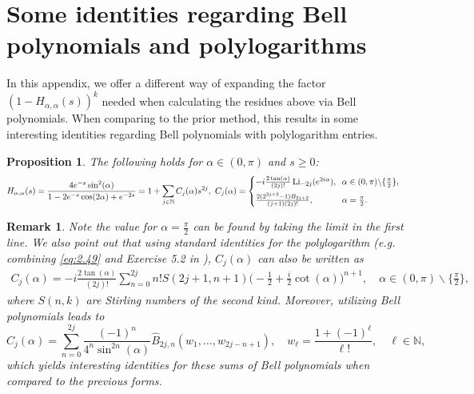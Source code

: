 \documentclass[letterpaper,10pt]{amsart}
\newtheorem{prop}[thm]{Proposition}
\newtheorem{remark}[thm]{Remark}
\DeclareMathOperator{\Li}{Li}
\numberwithin{equation}{section}
\begin{document}
\appendix

\section{Some identities regarding Bell polynomials and polylogarithms}\label{AppPoly}

In this appendix, we offer a different way of expanding the factor $(1-H_{\alpha,\alpha}(s))^k$ needed when calculating the residues above via Bell polynomials. When comparing to the prior method, this results in some interesting identities regarding Bell polynomials with polylogarithm entries.

\begin{prop}\label{Lem:H}
The following holds for $\alpha\in(0,\pi)$ and $s\geq0$: 
\begin{align}\label{Eq:Hseries}
&H_{\alpha,\alpha}(s)=\frac{4e^{-s}\sin^2(\alpha)}{1-2e^{-s}\cos(2\alpha)+e^{-2s}}=1+\sum_{j\in\mathbb{N}} C_j(\alpha) s^{2j},\ C_j(\alpha)=\begin{cases}
-i\frac{2\tan(\alpha)}{(2j)!}\Li_{-2j}(e^{2i\alpha}),& \hspace{-.1cm}\alpha\in(0,\pi)\backslash\{\tfrac{\pi}{2}\},\\[2mm]
\frac{2(2^{2j+2}-1)B_{2j+2}}{(j+1)(2j)!},& \hspace{-.1cm}\alpha=\tfrac{\pi}{2}.
\end{cases}
\end{align}
\end{prop}

\begin{remark}\label{Rem:H}
Note the value for $\alpha=\tfrac{\pi}{2}$ can be found by taking the limit in the first line. We also point out that using standard identities for the polylogarithm (e.g. combining \eqref{eq:2.49} and Exercise 5.2 in \cite{Co74}), $C_j(\alpha)$ can also be written as 
\begin{align}
C_j(\alpha)=-i\frac{2\tan(\alpha)}{(2j)!}\sum_{n=0}^{2j} n! S(2j+1,n+1)\bigg(-\frac{1}{2}+\frac{i}{2}\cot(\alpha)\bigg)^{n+1},\quad \alpha\in(0,\pi)\backslash\{\tfrac{\pi}{2}\},
\end{align}
where $S(n,k)$ are Stirling numbers of the second kind. Moreover, utilizing Bell polynomials leads to 
\begin{equation}
C_j(\alpha)=\sum_{n=0}^{2j}\frac{(-1)^n}{4^n\sin^{2n}(\alpha)}\widehat{B}_{2j,n}(w_1,\dots,w_{2j-n+1}),\quad w_{\ell}=\frac{1+(-1)^\ell}{\ell!},\quad \ell\in\mathbb{N},
\end{equation}
which yields interesting identities for these sums of Bell polynomials when compared to the previous forms.
\end{remark}
\end{document}
